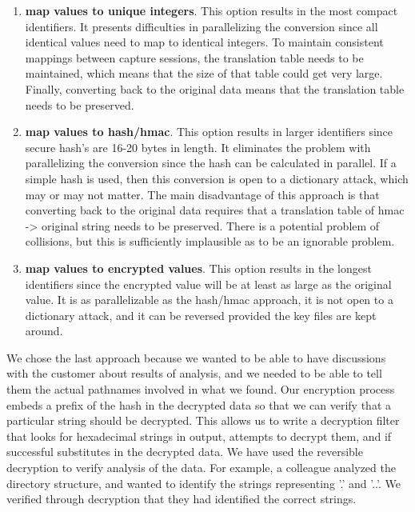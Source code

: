 \begin{enumerate}

\item {\bf map values to unique integers}.  This option results in the
most compact identifiers.  It presents difficulties in parallelizing
the conversion since all identical values need to map to identical
integers.  To maintain consistent mappings between capture sessions,
the translation table needs to be maintained, which means that the
size of that table could get very large.  Finally, converting back to
the original data means that the translation table needs to be preserved.

\item {\bf map values to hash/hmac}.  This option results in larger
identifiers since secure hash's are 16-20 bytes in length.  It
eliminates the problem with parallelizing the conversion since the
hash can be calculated in parallel.  If a simple hash is used, then
this conversion is open to a dictionary attack, which may or may not
matter.  The main disadvantage of this approach is that converting
back to the original data requires that a translation table of hmac ->
original string needs to be preserved.  There is a potential problem
of collisions, but this is sufficiently implausible as to be an
ignorable problem.

\item {\bf map values to encrypted values}.  This option results in
the longest identifiers since the encrypted value will be at least as
large as the original value.  It is as parallelizable as the hash/hmac
approach, it is not open to a dictionary attack, and it can be
reversed provided the key files are kept around.

\end{enumerate}

We chose the last approach because we wanted to be able to have
discussions with the customer about results of analysis, and we needed
to be able to tell them the actual pathnames involved in what we
found.  Our encryption process embeds a prefix of the hash in the
decrypted data so that we can verify that a particular string should
be decrypted.  This allows us to write a decryption filter that looks
for hexadecimal strings in output, attempts to decrypt them, and if
successful substitutes in the decrypted data.  We have used the
reversible decryption to verify analysis of the data.  For example, a
colleague analyzed the directory structure, and wanted to identify the
strings representing '.' and '..'.  We verified through decryption
that they had identified the correct strings.


